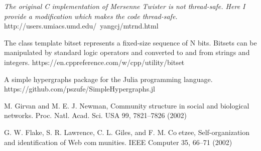 \documentclass[conference]{IEEEtran}
\begin{document}
\begin{thebibliography}{1}
\emph{The original C implementation of Mersenne Twister is not thread-safe. Here I provide a modification which makes the code thread-safe.}
http://users.umiacs.umd.edu/~yangcj/mtrnd.html

The class template bitset represents a fixed-size sequence of N bits. Bitsets can be manipulated by standard logic operators and converted to and from strings and integers.
https://en.cppreference.com/w/cpp/utility/bitset

A simple hypergraphs package for the Julia programming language.
https://github.com/pszufe/SimpleHypergraphs.jl

M. Girvan and M. E. J. Newman, Community structure
in social and biological networks. Proc. Natl. Acad. Sci.
USA 99, 7821–7826 (2002)

G. W. Flake, S. R. Lawrence, C. L. Giles, and F. M. Coetzee, Self-organization and identification of Web communities. IEEE Computer 35, 66–71 (2002)


\end{thebibliography}
\end{document}
